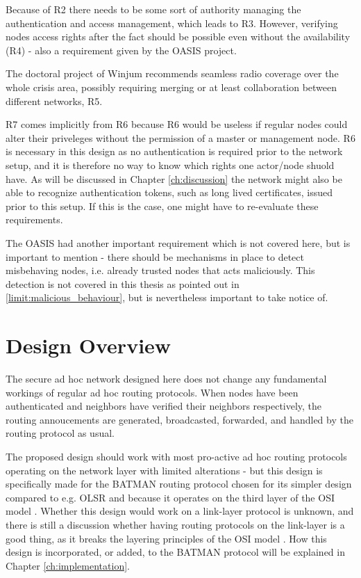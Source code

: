 Because of R2 there needs to be some sort of authority managing the
authentication and access management, which leads to R3. However, verifying
nodes access rights after the fact should be possible even without the
availability (R4) - also a requirement given by the OASIS project.

The doctoral project of Winjum recommends seamless radio coverage over the whole
crisis area, possibly requiring merging or at least collaboration between
different networks, R5.

R7 comes implicitly from R6 because R6 would be useless if regular nodes could
alter their priveleges without the permission of a master or management node. R6
is necessary in this design as no authentication is required prior to the
network setup, and it is therefore no way to know which rights one actor/node
shuold have. As will be discussed in Chapter \ref{ch:discussion} the network
might also be able to recognize authentication tokens, such as long lived
certificates, issued prior to this setup. If this is the case, one might have to
re-evaluate these requirements.

The OASIS had another important requirement which is not covered here, but is
important to mention - there should be mechanisms in place to detect misbehaving
nodes, i.e. already trusted nodes that acts maliciously. This detection is not
covered in this thesis as pointed out in \ref{limit:malicious_behaviour}, but is
nevertheless important to take notice of.

\section{Design Overview}
The secure ad hoc network designed here does not change any fundamental workings
of regular ad hoc routing protocols. When nodes have been authenticated and
neighbors have verified their neighbors respectively, the routing annoucements
are generated, broadcasted, forwarded, and handled by the routing protocol as
usual.

The proposed design should work with most pro-active ad hoc routing protocols
operating on the network layer with limited alterations - but this design is
specifically made for the BATMAN \cite{batman_rfc} routing protocol chosen for
its simpler design compared to e.g. OLSR \cite{clausen2003rfc3626} and because
it operates on the third layer of the \ac{OSI} model \cite{zimmermann1980osi}.
Whether this design would work on a link-layer protocol is unknown, and there is
still a discussion whether having routing protocols on the link-layer is a good
thing, as it breaks the layering principles of the \ac{OSI} model
\cite{5680190}. How this design is incorporated, or added, to the BATMAN
protocol will be explained in Chapter \ref{ch:implementation}.

